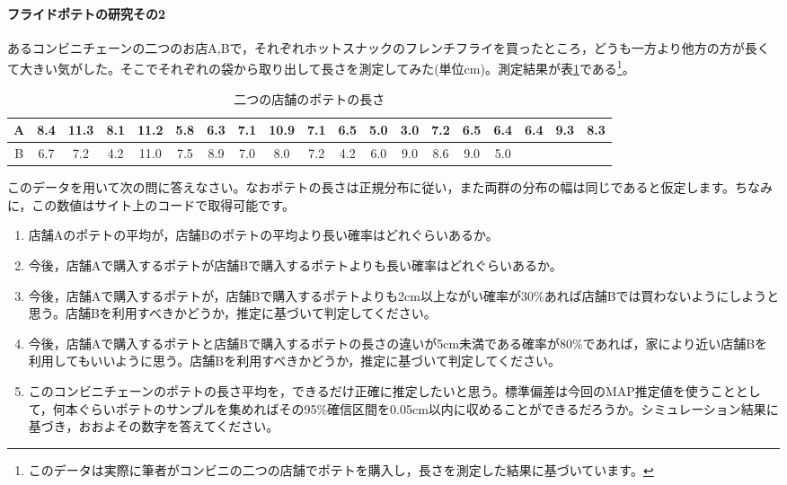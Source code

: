 \documentclass{ltjsbook}
\begin{document}
\paragraph{フライドポテトの研究その2}
あるコンビニチェーンの二つのお店A,Bで，それぞれホットスナックのフレンチフライを買ったところ，どうも一方より他方の方が長くて大きい気がした。そこでそれぞれの袋から取り出して長さを測定してみた(単位cm)。測定結果が表\ref{tab::19_01}である\footnote{このデータは実際に筆者がコンビニの二つの店舗でポテトを購入し，長さを測定した結果に基づいています。}。
\begin{table}[ht]
    \center
    \caption{二つの店舗のポテトの長さ}
\begin{tabular}{c|cccccccccccccccccc}\hline
    A & 8.4 & 11.3 & 8.1 & 11.2 & 5.8 & 6.3 & 7.1 & 10.9 & 7.1 & 6.5 & 5.0 & 3.0 & 7.2 & 6.5 & 6.4 & 6.4 & 9.3 & 8.3 \\\hline
    B & 6.7 & 7.2 & 4.2 & 11.0 & 7.5 & 8.9 & 7.0 & 8.0 & 7.2 & 4.2 & 6.0 & 9.0 & 8.6 & 9.0 & 5.0 &  &  &  \\\hline
\end{tabular}
\label{tab::19_01}
\end{table}
このデータを用いて次の問に答えなさい。なおポテトの長さは正規分布に従い，また両群の分布の幅は同じであると仮定します。ちなみに，この数値はサイト上のコードで取得可能です。
\begin{enumerate}
    \item 店舗Aのポテトの平均が，店舗Bのポテトの平均より長い確率はどれぐらいあるか。
    \item 今後，店舗Aで購入するポテトが店舗Bで購入するポテトよりも長い確率はどれぐらいあるか。
    \item 今後，店舗Aで購入するポテトが，店舗Bで購入するポテトよりも2cm以上ながい確率が30\%あれば店舗Bでは買わないようにしようと思う。店舗Bを利用すべきかどうか，推定に基づいて判定してください。
    \item 今後，店舗Aで購入するポテトと店舗Bで購入するポテトの長さの違いが5cm未満である確率が80\%であれば，家により近い店舗Bを利用してもいいように思う。店舗Bを利用すべきかどうか，推定に基づいて判定してください。
    \item このコンビニチェーンのポテトの長さ平均を，できるだけ正確に推定したいと思う。標準偏差は今回のMAP推定値を使うこととして，何本ぐらいポテトのサンプルを集めればその95\%確信区間を0.05cm以内に収めることができるだろうか。シミュレーション結果に基づき，おおよその数字を答えてください。
\end{enumerate}
\end{document}
